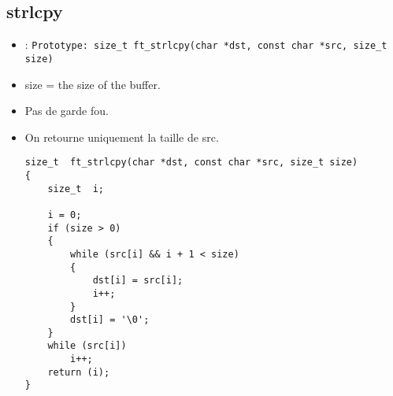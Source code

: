 \documentclass{article}
\begin{document}
	\subsection{strlcpy}
		\begin{itemize}[label=$\rightarrow$]
			\item: \texttt{Prototype: \texttt{size\_t  ft\_strlcpy(char *dst, const char *src, size\_t size) }}
			\item size = the size of the buffer.
			\item Pas de garde fou.
			 \item On retourne uniquement la taille de src.
			\begin{verbatim}
size_t  ft_strlcpy(char *dst, const char *src, size_t size)                     
{                                                                               
    size_t  i;                                                                  
                                                                                
    i = 0;                                                                      
    if (size > 0)                                                               
    {                                                                           
        while (src[i] && i + 1 < size)                                          
        {                                                                       
            dst[i] = src[i];                                                    
            i++;                                                                
        }                                                                       
        dst[i] = '\0';                                                          
    }                                                                           
    while (src[i])                                                              
        i++;                                                                    
    return (i);                                                                 
} 
			\end{verbatim}
		\end{itemize}
	
\end{document}

